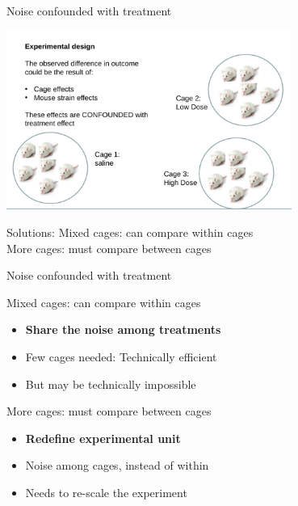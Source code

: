 \documentclass{beamer}
\begin{document}
\begin{frame}{ Noise confounded with treatment}

 \begin{center}
  \includegraphics[width=0.7\textwidth]{Figures/mice}
 \end{center}
 
 \pause
 
 \begin{block}{Solutions:}
  Mixed cages: can compare within cages \\
  More cages: must compare between cages 
 \end{block}

\end{frame}

\begin{frame}{ Noise confounded with treatment}

  \begin{block}{Mixed cages: can compare within cages}
    \begin{itemize}
     \item \textbf{Share the noise among treatments}
     \item Few cages needed: Technically efficient
     \item But may be technically impossible
    \end{itemize}
  \end{block}

 \pause
 
 \begin{block}{More cages: must compare between cages }
    \begin{itemize}
    \item \textbf{Redefine experimental unit}
    \item Noise among cages, instead of within
    \item Needs to re-scale the experiment
    \end{itemize} 
 \end{block}

\end{frame}
\end{document}
